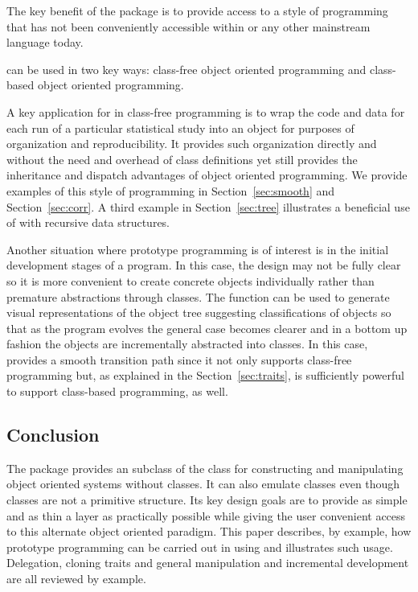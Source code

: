 \documentclass{Z}
\begin{document}
The key benefit of the  package is to provide 
access to a style of programming that has not been conveniently
accessible within  or any other mainstream language today.

 can be used in two key ways: class-free object oriented programming
and class-based object oriented programming.  

A key application for  in class-free programming is to wrap the code
and data for each run of a particular statistical study into an object for
purposes of organization and reproducibility.  It provides such organization
directly and without the need and overhead of class definitions
yet still provides the
inheritance and dispatch advantages of object oriented programming.  
We provide examples of this style of programming in 
Section~\ref{sec:smooth}
and
Section~\ref{sec:corr}.
A third example in 
Section~\ref{sec:tree} illustrates a beneficial use of  with 
recursive data structures.  

Another situation where prototype programming is of interest is in the initial
development stages of a program.  In this case, the design may not be fully
clear so it is more convenient to create concrete objects individually rather
than premature abstractions through classes.  The 
function can be used to generate visual representations of the object
tree suggesting classifications of objects so that 
as the program evolves the general case becomes clearer and
in a bottom up fashion the objects are incrementally abstracted into 
classes.  In this case,
 provides a smooth transition path since it not only supports
class-free programming but, as explained in the Section~\ref{sec:traits}, is
sufficiently powerful to support class-based programming, as well.   


\subsection{Conclusion}
\label{sec:conclusion}

The package  provides an  subclass of the
 class for constructing and manipulating object
oriented systems without classes.  It can also emulate classes even
though classes are not a primitive structure.  Its key design goals
are to provide as simple and as thin a layer as practically possible
while giving the user convenient access to this alternate object
oriented paradigm.  This paper describes, by example, how prototype
programming can be carried out in  using  and
illustrates such usage.  Delegation, cloning traits and general
manipulation and incremental development are all reviewed by example.
\end{document}

